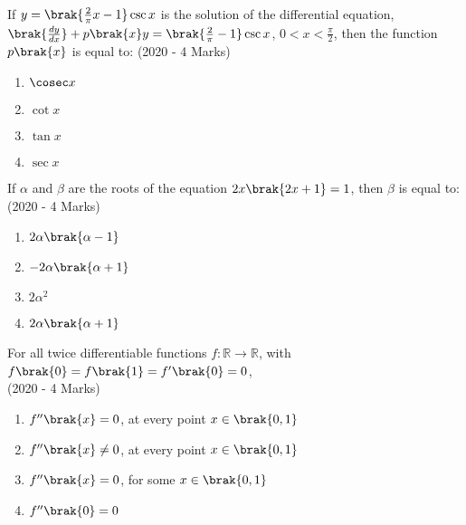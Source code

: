  	\item{
			If $y = \brak{\frac{2}{\pi}x-1} \csc x$ is the solution of the differential equation, $\brak{\frac{dy}{dx}}+p\brak{x}y = \brak{\frac{2}{\pi}-1}\csc x$, $0<x<\frac{\pi}{2}$, then the function $p\brak{x}$ is equal to: 
			\hfill
			{(2020 - 4 Marks)}
			
			\begin{multicols}{4}
				\begin{enumerate}
					\item $\cosec x$
					\item $\cot x$
					\item $\tan x$
					\item $\sec x$
				\end{enumerate}
			\end{multicols}
			
		}
 	\item{
			If $\alpha$ and $\beta$ are the roots of the equation $2x\brak{2x+1} = 1$, then $\beta$ is equal to:\\ \text{ }
			\hfill
			{(2020 - 4 Marks)}
			
			\begin{multicols}{2}
				\begin{enumerate}
					\item $2\alpha\brak{\alpha-1}$
					\item $-2\alpha\brak{\alpha+1}$
					\item $2\alpha^2$
					\item $2\alpha\brak{\alpha+1}$
				\end{enumerate}
			\end{multicols}
			
		}
    \item{
            For all twice differentiable functions \( f: \mathbb{R} \to \mathbb{R} \), with \( f\brak{0} = f\brak{1} = f^{\prime}\brak{0} = 0 \), \\ \text{ }
             \hfill
                {(2020 - 4 Marks)}
            \begin{multicols}{2}
                \begin{enumerate}
                    \item $f^{\prime\prime}\brak{x} = 0$, at every point $x \in \brak{0,1}$
                    \item $f^{\prime\prime}\brak{x} \neq 0$, at every point $x \in \brak{0,1}$
                    \item $f^{\prime\prime}\brak{x} = 0$, for some $x \in \brak{0,1}$
                    \item $f^{\prime\prime}\brak{0} = 0$
                \end{enumerate}
            \end{multicols}

        
        }
